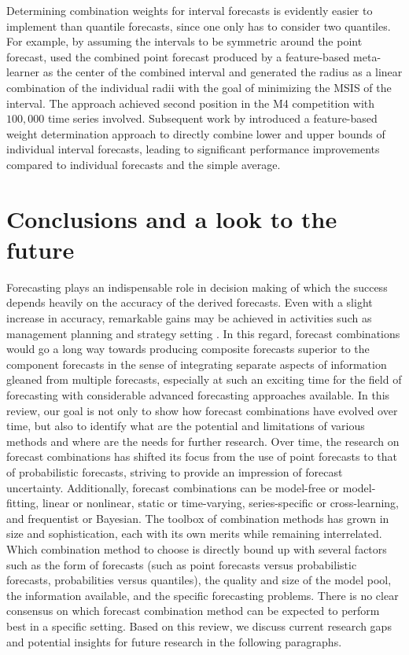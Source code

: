 \documentclass[11pt]{article}
\begin{document}
Determining combination weights for interval forecasts is evidently easier to implement than quantile forecasts, since one only has to consider two quantiles. For example, by assuming the intervals to be symmetric around the point forecast, \citet{Montero-Manso2020-tq} used the combined point forecast produced by a feature-based meta-learner as the center of the combined interval and generated the radius as a linear combination of the individual radii with the goal of minimizing the MSIS \citep[mean scaled interval score,][]{Gneiting2007-ij} of the interval. The approach achieved second position in the M4 competition with $100,000$ time series involved. Subsequent work by \citet{Wang2021-un} introduced a feature-based weight determination approach to directly combine lower and upper bounds of individual interval forecasts, leading to significant performance improvements compared to individual forecasts and the simple average.

\section{Conclusions and a look to the future}
\label{sec:conclusion}

Forecasting plays an indispensable role in decision making of which the success depends heavily on the accuracy of the derived forecasts. Even with a slight increase in accuracy, remarkable gains may be achieved in activities such as management planning and strategy setting \citep{Makridakis1996-cf,Syntetos2009-ho,Hyndman2021-tx,Petropoulos2021-ft}. In this regard, forecast combinations would go a long way towards producing composite forecasts superior to the component forecasts in the sense of integrating separate aspects of information gleaned from multiple forecasts, especially at such an exciting time for the field of forecasting with considerable advanced forecasting approaches available. In this review, our goal is not only to show how forecast combinations have evolved over time, but also to identify what are the potential and limitations of various methods and where are the needs for further research. Over time, the research on forecast combinations has shifted its focus from the use of point forecasts to that of probabilistic forecasts, striving to provide an impression of forecast uncertainty. Additionally, forecast combinations can be model-free or model-fitting, linear or nonlinear, static or time-varying, series-specific or cross-learning, and frequentist or Bayesian. The toolbox of combination methods has grown in size and sophistication, each with its own merits while remaining interrelated. Which combination method to choose is directly bound up with several factors such as the form of forecasts (such as point forecasts versus probabilistic forecasts, probabilities versus quantiles), the quality and size of the model pool, the information available, and the specific forecasting problems. There is no clear consensus on which forecast combination method can be expected to perform best in a specific setting. Based on this review, we discuss current research gaps and potential insights for future research in the following paragraphs.
\end{document}

